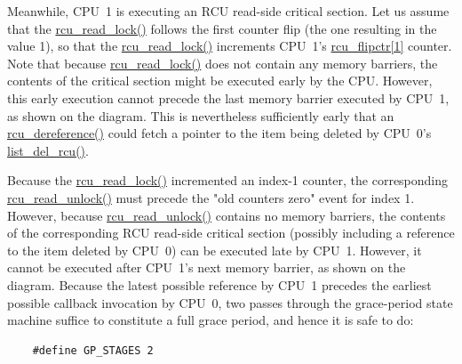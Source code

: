 Meanwhile, CPU~1 is executing an RCU read-side critical section.
Let us assume that the \url{rcu_read_lock()} follows the first
counter flip (the one resulting in the value 1), so that the
\url{rcu_read_lock()} increments CPU~1's
\url{rcu_flipctr[1]} counter.
Note that because \url{rcu_read_lock()} does not contain any
memory barriers, the contents of the critical section might be executed
early by the CPU.
However, this early execution cannot precede the last memory barrier
executed by CPU~1, as shown on the diagram.
This is nevertheless sufficiently early that an \url{rcu_dereference()}
could fetch a pointer to the item being deleted by CPU~0's
\url{list_del_rcu()}.

Because the \url{rcu_read_lock()} incremented an index-1 counter,
the corresponding \url{rcu_read_unlock()} must
precede the "old counters zero" event for index 1.
However, because \url{rcu_read_unlock()} contains no memory
barriers, the contents of the corresponding RCU read-side critical
section (possibly including a reference to the item deleted by
CPU~0) can be executed late by CPU~1.
However, it cannot be executed after CPU~1's next memory barrier,
as shown on the diagram.
Because the latest possible reference by CPU~1 precedes the
earliest possible callback invocation by CPU~0, two passes
through the grace-period state machine suffice to constitute
a full grace period, and hence it is safe to do:

\vspace{5pt}
\begin{minipage}[t]{\columnwidth}
\small
\begin{verbatim}
    #define GP_STAGES 2
\end{verbatim}
\end{minipage}
\vspace{5pt}

